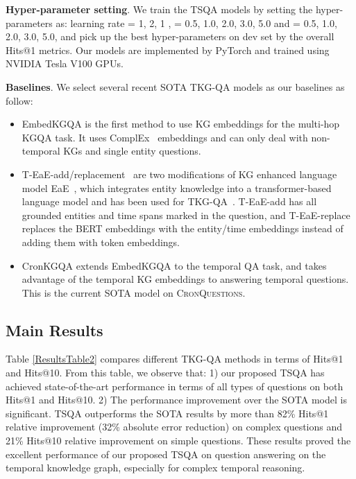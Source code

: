 \documentclass[11pt]{article}
\newcommand{\xhdr}[1]{{\noindent\bfseries #1}.}
\begin{document}
\smallskip
\xhdr{Hyper-parameter setting} We train the TSQA models by setting the hyper-parameters as: learning rate = 1, 2, 1 ,  = 0.5, 1.0, 2.0, 3.0, 5.0 and  = 0.5, 1.0, 2.0, 3.0, 5.0, and pick up the best hyper-parameters on dev set by the overall Hits@1 metrics. 
Our models are implemented by PyTorch and trained using NVIDIA Tesla V100 GPUs.


\smallskip
\xhdr{Baselines} We select several recent SOTA TKG-QA models as our baselines as follow:
\begin{itemize}[leftmargin=*]
    \item  EmbedKGQA \cite{saxena2020improving} is the first method to use KG embeddings for the multi-hop KGQA task. It uses ComplEx~\cite{trouillon2016complex} embeddings and can only deal with non-temporal KGs and single entity questions.

    \item T-EaE-add/replacement~\cite{saxena2021question} are two modifications of KG enhanced language model EaE~\cite{fevry2020entities}, which integrates entity knowledge into a transformer-based language model and has been used for TKG-QA~\cite{saxena2020improving}. T-EaE-add has all grounded entities and time spans marked in the question, and T-EaE-replace replaces the BERT embeddings with the entity/time embeddings instead of adding them with token embeddings.
    
    \item CronKGQA \cite{saxena2021question} extends EmbedKGQA to the temporal QA task, and takes advantage of the temporal KG embeddings to answering temporal questions. This is the current SOTA model on \textsc{CronQuestions}.
\end{itemize}








\subsection{Main Results}
Table \ref{ResultsTable2} compares different TKG-QA methods in terms of Hits@1 and Hits@10. From this table, we observe that: 1) our proposed TSQA has achieved state-of-the-art performance in terms of all types of questions on both Hits@1 and Hits@10. 2) The performance improvement over the SOTA model is significant. TSQA outperforms the SOTA results by more than 82\% Hits@1 relative improvement (32\% absolute error reduction) on complex questions and 21\% Hits@10 relative improvement on simple questions.
These results proved the excellent performance of our proposed TSQA on question answering on the temporal knowledge graph, especially for complex temporal reasoning.
\end{document}
